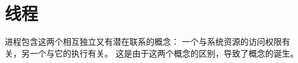 
\chapter{线程}
{
    进程包含这两个相互独立又有潜在联系的概念：
    一个与系统资源的访问权限有关，另一个与它的执行有关。
    这是由于这两个概念的区别，导致了概念的诞生。

    
}

\cleardoublepage

\endinput
